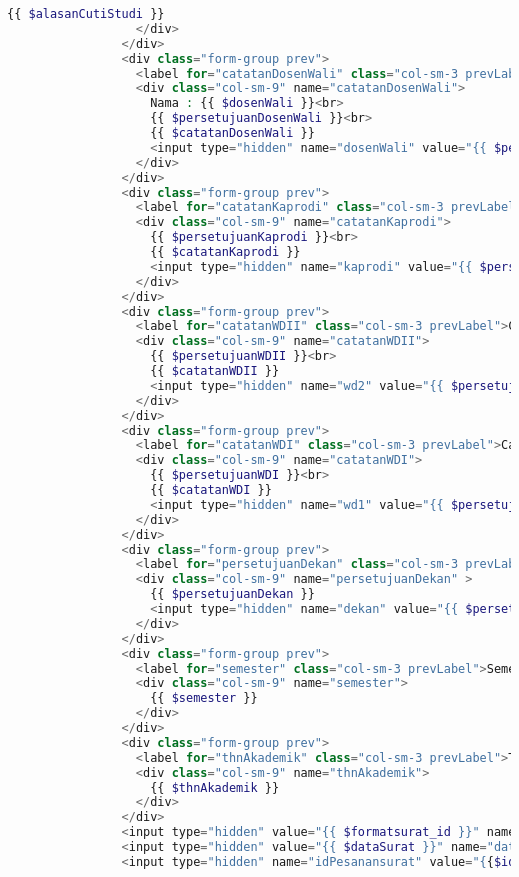 \begin{lstlisting}[language=php,basicstyle=\tiny,caption=\textit{Preview} isi persetujuan dan catatan]
                    {{ $alasanCutiStudi }}
                  </div>
                </div>
                <div class="form-group prev">
                  <label for="catatanDosenWali" class="col-sm-3 prevLabel">Catatan dosen wali </label>
                  <div class="col-sm-9" name="catatanDosenWali">
                    Nama : {{ $dosenWali }}<br>
                    {{ $persetujuanDosenWali }}<br>
                    {{ $catatanDosenWali }}
                    <input type="hidden" name="dosenWali" value="{{ $persetujuanDosenWali }}|{{ $catatanDosenWali }}" />
                  </div>
                </div>
                <div class="form-group prev">
                  <label for="catatanKaprodi" class="col-sm-3 prevLabel">Catatan Kaprodi </label>
                  <div class="col-sm-9" name="catatanKaprodi">
                    {{ $persetujuanKaprodi }}<br>
                    {{ $catatanKaprodi }}
                    <input type="hidden" name="kaprodi" value="{{ $persetujuanKaprodi }}|{{ $catatanKaprodi }}" />
                  </div>
                </div>
                <div class="form-group prev">
                  <label for="catatanWDII" class="col-sm-3 prevLabel">Catatan WD II</label>
                  <div class="col-sm-9" name="catatanWDII">
                    {{ $persetujuanWDII }}<br>
                    {{ $catatanWDII }}
                    <input type="hidden" name="wd2" value="{{ $persetujuanWDII }}|{{ $catatanWDII }}" />
                  </div>
                </div>
                <div class="form-group prev">
                  <label for="catatanWDI" class="col-sm-3 prevLabel">Catatan WD I</label>
                  <div class="col-sm-9" name="catatanWDI">
                    {{ $persetujuanWDI }}<br>
                    {{ $catatanWDI }}
                    <input type="hidden" name="wd1" value="{{ $persetujuanWDI }}|{{ $catatanWDI }}" />
                  </div>
                </div>
                <div class="form-group prev">
                  <label for="persetujuanDekan" class="col-sm-3 prevLabel">Persetujuan Dekan</label>
                  <div class="col-sm-9" name="persetujuanDekan" >
                    {{ $persetujuanDekan }}
                    <input type="hidden" name="dekan" value="{{ $persetujuanDekan }}" />
                  </div>
                </div>
                <div class="form-group prev">
                  <label for="semester" class="col-sm-3 prevLabel">Semester</label>
                  <div class="col-sm-9" name="semester">
                    {{ $semester }}
                  </div>
                </div>
                <div class="form-group prev">
                  <label for="thnAkademik" class="col-sm-3 prevLabel">Tahun Akademik</label>
                  <div class="col-sm-9" name="thnAkademik">
                    {{ $thnAkademik }}
                  </div>
                </div>
                <input type="hidden" value="{{ $formatsurat_id }}" name="idFormat">
                <input type="hidden" value="{{ $dataSurat }}" name="dataSurat">
                <input type="hidden" name="idPesanansurat" value="{{$idPesanansurat}}">


\end{lstlisting}
